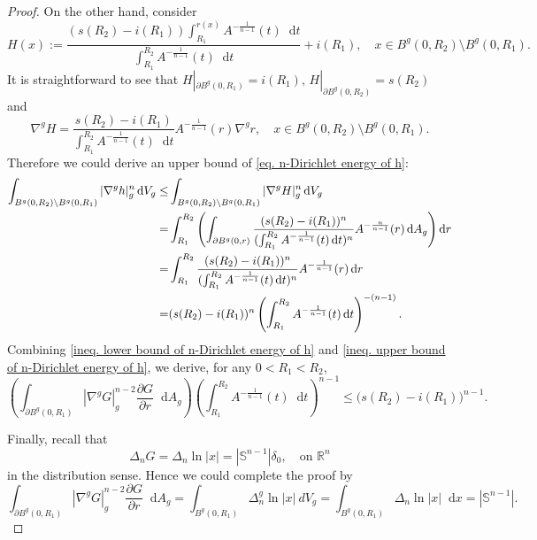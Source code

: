 \documentclass[10pt,a4paper]{amsart}
\numberwithin{equation}{section}
\newcommand{\dd}{\mathop{}\!\mathrm{d}}%
\newcommand{\dx}{\mathop{}\!\mathrm{d}x}
\newcommand{\nablag}{\nabla^g} %
\begin{document}
\begin{proof}
    On the other hand, consider 
    \[
        H(x):=\frac{(s(R_2)-i(R_1))\int_{R_1}^{r(x)}A^{-\frac{1}{n-1}}(t)\dd t}{\int_{R_1}^{R_2} A^{-\frac{1}{n-1}}(t)\dd t}
        +i(R_1),\quad x\in B^g(0,R_2)\setminus B^g(0,R_1).
    \]
    It is straightforward to see that $H|_{\partial B^g(0,R_1)}=i(R_1),\, H|_{\partial B^g(0,R_2)}=s(R_2)$ and
    \[
        \nablag H=\frac{s(R_2)-i(R_1)}{\int_{R_1}^{R_2} A^{-\frac{1}{n-1}}(t)\dd t}
        A^{-\frac{1}{n-1}}(r)\nabla^gr,\quad x\in B^g(0,R_2)\setminus B^g(0,R_1).
    \]
    Therefore we could derive an upper bound of \cref{eq. n-Dirichlet energy of h}:
    \begin{align}
        \int_{B^g(0,R_2)\setminus B^g(0,R_1)}|\nabla^g h|_g^n\dd V_g\notag
        \leq& \int_{B^g(0,R_2)\setminus B^g(0,R_1)}|\nabla^g H|_g^n\dd V_g\notag\\
        =&\int_{R_1}^{R_2}\left(
        \int_{\partial B^g(0,r)}\frac{(s(R_2)-i(R_1))^n}{(\int_{R_1}^{R_2} A^{-\frac{1}{n-1}}(t)\dd t)^n} A^{-\frac{n}{n-1}}(r)\dd A_g
        \right)\dd r\notag\\
        =&\int_{R_1}^{R_2}
        \frac{(s(R_2)-i(R_1))^n}{(\int_{R_1}^{R_2} A^{-\frac{1}{n-1}}(t)\dd t)^n} A^{-\frac{1}{n-1}}(r)
        \dd r\notag\\
        =&(s(R_2)-i(R_1))^n
        \left(
        \int_{R_1}^{R_2} A^{-\frac{1}{n-1}}(t)\dd t
        \right)^{-(n-1)}.\label{ineq. upper bound of n-Dirichlet energy of h}
    \end{align}
    Combining  \cref{ineq. lower bound of n-Dirichlet energy of h} and \cref{ineq. upper bound of n-Dirichlet energy of h}, we derive, for any $0<R_1<R_2$,
    \[
        \left(\int_{\partial B^g(0,R_1)}|\nablag G|_g^{n-2}\frac{\partial G}{\partial r}\dd A_g\right)
        \left(
        \int_{R_1}^{R_2} A^{-\frac{1}{n-1}}(t)\dd t
        \right)^{n-1}
        \leq 
        \big(
        s(R_2)-i(R_1)
        \big)^{n-1}.
    \]

    Finally, recall that 
    \[
        \Delta_n G=\Delta_n \ln |x|=|\mathbb{S}^{n-1}|\delta_0,\quad \text{on }\mathbb{R}^n
    \]
    in the distribution sense.  Hence we could complete the proof by
    \[
        \int_{\partial B^g(0,R_1)}|\nablag G|_g^{n-2}\frac{\partial G}{\partial r}\dd A_g
        =\int_{B^g(0,R_1)}\Delta_n^g
        \ln |x| \ d V_g
        =\int_{B^g(0,R_1)}\Delta_n\ln |x| \dx
        =|\mathbb{S}^{n-1}|.
    \]
\end{proof}
\end{document}
